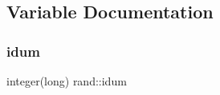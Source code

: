 \subsection{Variable Documentation}
\mbox{\label{namespacerand_a8271f5341966bf15edcabc95e23ffcec}} 
\subsubsection{\texorpdfstring{idum}{idum}}
{\footnotesize\ttfamily integer(long) rand\+::idum\hspace{0.3cm}{\ttfamily [private]}}

